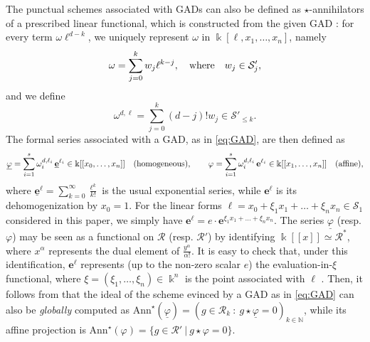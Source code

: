 \documentclass{amsart}
\theoremstyle{plain}
\renewcommand{\k}{\Bbbk}
\renewcommand{\S}{\mathcal{S}}
\newcommand{\N}{\mathbb{N}}
\newcommand{\Ann}{\textnormal{Ann}}
\def\a{\alpha}
\def\R{\mathcal{R}}
\def\Ann{\mathrm{Ann}}
\numberwithin{equation}{section}
\begin{document}
The punctual schemes associated with GADs can also be defined as $\star$-annihilators of a prescribed linear functional, which is constructed from the given GAD \cite{BMT25}: for every term $\omega \ell^{d-k}$, we uniquely represent $\omega$ in $\k[\ell, x_1, \dots, x_n]$, namely 
\[ \omega = \sum_{j=0}^{k} w_{j} \ell^{k-j}, \quad \textnormal{where} \quad w_{j} \in \S'_{j}, \]
and we define 
\begin{equation} \label{eq:omegaell}
    \omega^{d,\ell} = \sum_{j=0}^{k} (d-j)! w_{j} \in \S'_{\leq k}.
\end{equation}
The formal series associated with a GAD, as in \cref{eq:GAD}, are then defined as
\begin{equation}\label{eq: exponential}
    \underline{\varphi} = \sum_{i=1}^s \omega_i^{d,\ell_i}\, \underline{\mathbf{e}}^{\ell_i} \in \k[[x_0,\dots,x_n]] \quad \textnormal{(homogeneous)}, \qquad \varphi = \sum_{i=1}^s \omega_i^{d,\ell_i}\, \mathbf{e}^{\ell_i} \in \k[[x_1,\dots,x_n]] \quad \textnormal{(affine)},
\end{equation} 
where $\underline{\mathbf{e}}^{\ell} = \sum_{k=0}^{\infty} \frac{\ell^k}{k!}$ is the usual exponential series, while $\mathbf{e}^{\ell}$ is its dehomogenization by $x_0 = 1$.
For the linear forms $\ell = x_0 + \xi_1 x_1 + \dots + \xi_n x_n \in \S_1$ considered in this paper, we simply have $\mathbf{e}^{\ell} = e \cdot \mathbf{e}^{\xi_1 x_1 + \dots + \xi_n x_n}$.
The series $\underline{\varphi}$ (resp. $\varphi$) may be seen as a functional on $\R$ (resp. $\R'$) by identifying $\k[[x]] \simeq \R^*$, where $x^{\a}$ represents the dual element of $\frac{y^{\a}}{\a!}$.
It is easy to check that, under this identification, $\mathbf{e}^{\ell}$ represents (up to the non-zero scalar $e$) the evaluation-in-$\xi$ functional, where $\xi = (\xi_1,\dots,\xi_n) \in \k^n$ is the point associated with $\ell$ \cite[§2.1.1]{M18}.
Then, it follows from \cite{BMT25} that the ideal of the scheme evinced by a GAD as in \cref{eq:GAD} can also be \emph{globally} computed as $\Ann^{\star}(\underline{\varphi}) = ( g \in \R_k \ : \ g \star \underline{\varphi} = 0 )_{k \in \N}$, while its affine projection is $\Ann^{\star}(\varphi) = \{ g \in \R' \ | \ g \star \varphi = 0\}$.
\end{document}
